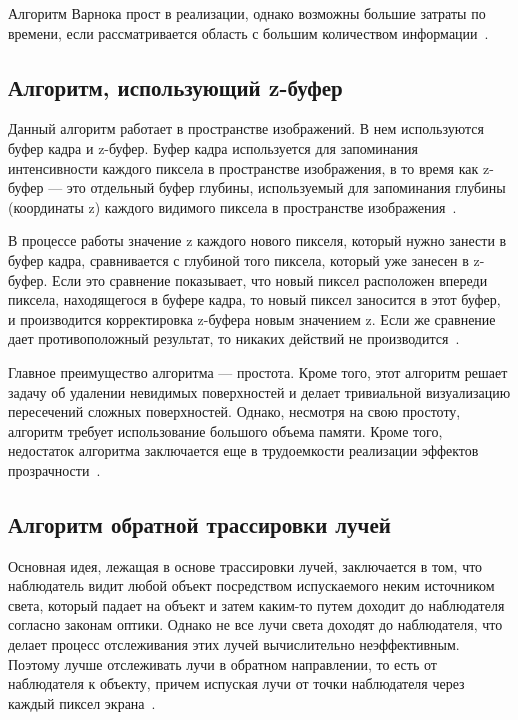 Алгоритм Варнока прост в реализации, однако возможны большие затраты по
времени, если рассматривается область с большим количеством информации~\cite{rojers}.

\subsection{Алгоритм, использующий z-буфер}

Данный алгоритм работает в пространстве изображений. В нем
используются буфер кадра и z-буфер. Буфер кадра используется для запоминания
интенсивности каждого пиксела в пространстве изображения, в то время как z-
буфер — это отдельный буфер глубины, используемый для запоминания глубины
(координаты z) каждого видимого пиксела в пространстве изображения~\cite{rojers}.

В процессе работы значение z каждого нового пикселя, который нужно
занести в буфер кадра, сравнивается с глубиной того пиксела, который уже занесен
в z-буфер. Если это сравнение показывает, что новый пиксел расположен впереди
пиксела, находящегося в буфере кадра, то новый пиксел заносится в этот буфер, и
производится корректировка z-буфера новым значением z. Если же сравнение дает
противоположный результат, то никаких действий не производится~\cite{rojers}.

Главное преимущество алгоритма --- простота. Кроме того, этот алгоритм
решает задачу об удалении невидимых поверхностей и делает тривиальной
визуализацию пересечений сложных поверхностей. Однако, несмотря на свою
простоту, алгоритм требует использование большого объема памяти. Кроме того,
недостаток алгоритма заключается еще в трудоемкости реализации эффектов
прозрачности~\cite{rojers}.

\subsection{Алгоритм обратной трассировки лучей}

Основная идея, лежащая в основе трассировки лучей, заключается в том, что
наблюдатель видит любой объект посредством испускаемого неким источником
света, который падает на объект и затем каким-то путем доходит до наблюдателя
согласно законам оптики. Однако не все лучи света доходят до наблюдателя, что
делает процесс отслеживания этих лучей вычислительно неэффективным.
Поэтому лучше отслеживать лучи в обратном направлении, то есть от наблюдателя
к объекту, причем испуская лучи от точки наблюдателя через каждый пиксел
экрана~\cite{raytracing}.

